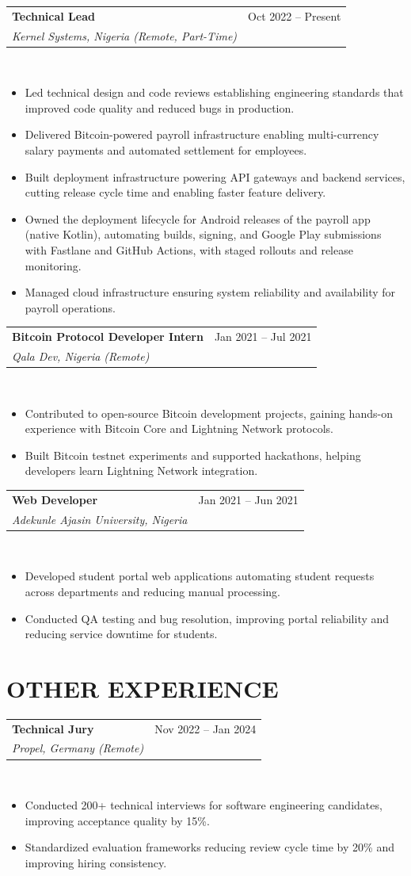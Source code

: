 \documentclass[a4paper,11pt]{article}
\makeatletter
\newenvironment{joblong}[3]
    {
    \needspace{6\baselineskip}
    \parskip=0pt
    \noindent
    \begin{tabular*}{\textwidth}[t]{@{}l@{\extracolsep{\fill}}r@{}}
    \textbf{#1} & #2 \\
    \textit{#3} &
    \end{tabular*}\\[2pt]
    \nopagebreak
    \begin{itemize}[nosep,after=\strut, leftmargin=1em, itemsep=2pt,label=--]
    }
    {
    \end{itemize}
    }
\makeatother
\begin{document}
\begin{joblong}{Technical Lead}{Oct 2022 -- Present}{Kernel Systems, Nigeria (Remote, Part-Time)}
\item Led technical design and code reviews establishing engineering standards that improved code quality and reduced bugs in production.
\item Delivered Bitcoin-powered payroll infrastructure enabling multi-currency salary payments and automated settlement for employees.
\item Built deployment infrastructure powering API gateways and backend services, cutting release cycle time and enabling faster feature delivery.
\item Owned the deployment lifecycle for Android releases of the payroll app (native Kotlin), automating builds, signing, and Google Play submissions with Fastlane and GitHub Actions, with staged rollouts and release monitoring.
\item Managed cloud infrastructure ensuring system reliability and availability for payroll operations.
\end{joblong}

\begin{joblong}{Bitcoin Protocol Developer Intern}{Jan 2021 -- Jul 2021}{Qala Dev, Nigeria (Remote)}
\item Contributed to open-source Bitcoin development projects, gaining hands-on experience with Bitcoin Core and Lightning Network protocols.
\item Built Bitcoin testnet experiments and supported hackathons, helping developers learn Lightning Network integration.
\end{joblong}

\begin{joblong}{Web Developer}{Jan 2021 -- Jun 2021}{Adekunle Ajasin University, Nigeria}
\item Developed student portal web applications automating student requests across departments and reducing manual processing.
\item Conducted QA testing and bug resolution, improving portal reliability and reducing service downtime for students.
\end{joblong}

\section{OTHER EXPERIENCE}

\begin{joblong}{Technical Jury}{Nov 2022 -- Jan 2024}{Propel, Germany (Remote)}
\item Conducted 200+ technical interviews for software engineering candidates, improving acceptance quality by 15\%.
\item Standardized evaluation frameworks reducing review cycle time by 20\% and improving hiring consistency.
\end{joblong}
\end{document}

